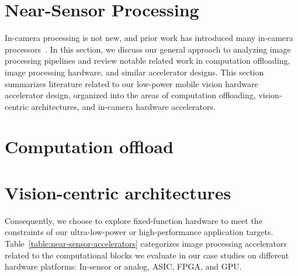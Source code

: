 \section{Near-Sensor Processing} \label{sec:nsp-background}

In-camera processing is not new, and prior work has introduced many in-camera processors~\cite{hauswald2014hybrid}. In this section, we discuss our general approach to analyzing image processing pipelines and review notable related work in computation offloading, image processing hardware, and similar accelerator designs. This section summarizes literature related to our low-power mobile vision hardware accelerator design, organized into the areas of computation offloading, vision-centric architectures, and in-camera hardware accelerators.

\section{Computation offload}

\section{Vision-centric architectures}

Consequently, we choose to explore fixed-function hardware to meet the constraints of our ultra-low-power or high-performance application targets. Table~\ref{table:near-sensor-accelerators} categorizes image processing accelerators related to the computational blocks we evaluate in our case studies on different hardware platforms: In-sensor or analog, ASIC, FPGA, and GPU.


\begin{table*}[h]
\caption{Related accelerators for in-camera processing.}
  \label{table:near-sensor-accelerators}
\end{table*}



